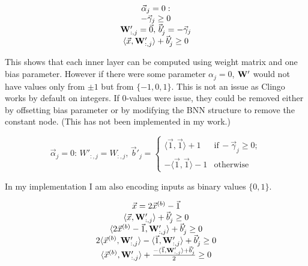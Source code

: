 \documentclass{fithesis}
\begin{document}
\begin{equation*}
    \begin{matrix}
        \vec\alpha_j = 0: \\
        - \vec\gamma_j \geq 0\\
        \mathbf{W}'_{:, j} = \vec 0, \,
        \vec b'_j = - \vec\gamma_j\\
        \langle \vec x, \mathbf{W}'_{:, j}\rangle + \vec b'_j \geq 0\\
    \end{matrix}
\end{equation*}

This shows that each inner layer can be computed using weight matrix and
one bias parameter. However if there were some parameter $\alpha_j = 0$,
$\mathbf{W}'$ would not have values only from $\pm 1$ but from $\{-1, 0, 1\}$.
This is not an issue as Clingo works by default on integers.
If 0-values were issue, they could be removed either by offsetting bias
parameter or by modifying the BNN structure to remove the constant node.
(This has not been implemented in my work.)

\begin{equation*}
    \vec \alpha_j = 0:\, W'_{:,j} = W_{:,j},\, \vec b'_j = \left\{
        \begin{matrix}
            \langle\vec 1, \vec 1\rangle + 1 & \mathrm{if}\,-\vec\gamma_j \geq 0;\\
            -\langle\vec 1, \vec 1\rangle - 1 & \mathrm{otherwise}
        \end{matrix}
    \right.
\end{equation*}

In my implementation I am also encoding inputs as binary values $\{0, 1\}$.

\begin{equation*}
    \begin{matrix}
        \vec x = 2 \vec x^{(b)} - \vec1\\
        \langle \vec x, \mathbf{W}'_{:, j}\rangle + \vec b'_j \geq 0\\
        \langle 2\vec x^{(b)} - \vec1, \mathbf{W}'_{:, j}\rangle + \vec b'_j \geq 0\\
        2\langle \vec x^{(b)}, \mathbf{W}'_{:, j}\rangle - \langle\vec1, \mathbf{W}'_{:,j}\rangle + \vec b'_j \geq 0\\
        \langle \vec x^{(b)}, \mathbf{W}'_{:, j}\rangle + \frac{- \langle\vec1, \mathbf{W}'_{:,j}\rangle + \vec b'_j}{2} \geq 0\\
    \end{matrix}
\end{equation*}
\end{document}
